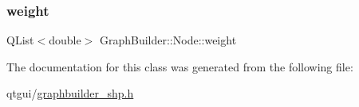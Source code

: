 \mbox{\label{class_graph_builder_1_1_node_a22ac7a5471919fbf17aad85949ce0cae}} 
\subsubsection{\texorpdfstring{weight}{weight}}
{\footnotesize\ttfamily Q\+List$<$double$>$ Graph\+Builder\+::\+Node\+::weight}



The documentation for this class was generated from the following file\+:\begin{DoxyCompactItemize}
\item 
qtgui/\mbox{\hyperlink{graphbuilder__shp_8h}{graphbuilder\+\_\+shp.\+h}}\end{DoxyCompactItemize}
